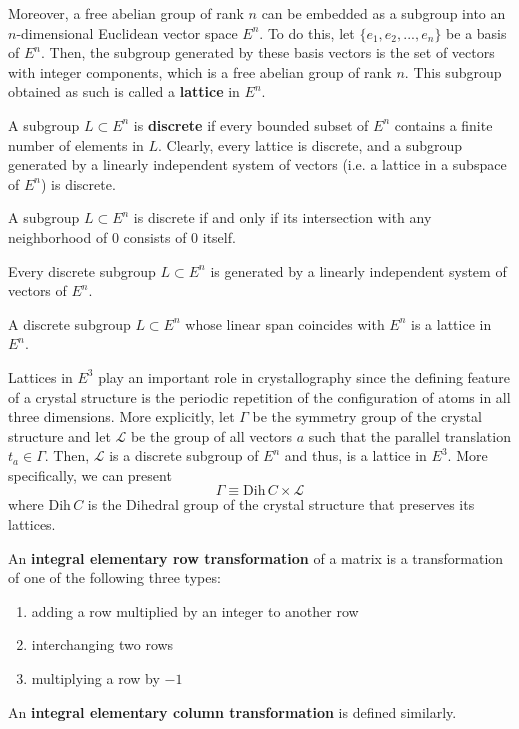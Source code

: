 \documentclass{article}
\begin{document}
  Moreover, a free abelian group of rank $n$ can be embedded as a subgroup into an $n$-dimensional Euclidean vector space $E^n$. To do this, let $\{e_1, e_2, ..., e_n\}$ be a basis of $E^n$. Then, the subgroup generated by these basis vectors is the set of vectors with integer components, which is a free abelian group of rank $n$. This subgroup obtained as such is called a \textbf{lattice} in $E^n$. 

  \begin{definition}
    A subgroup $L \subset E^n$ is \textbf{discrete} if every bounded subset of $E^n$ contains a finite number of elements in $L$. Clearly, every lattice is discrete, and a subgroup generated by a linearly independent system of vectors (i.e. a lattice in a subspace of $E^n$) is discrete. 
  \end{definition}

  \begin{lemma}
    A subgroup $L \subset E^n$ is discrete if and only if its intersection with any neighborhood of $0$ consists of $0$ itself. 
  \end{lemma}

  \begin{theorem}
    Every discrete subgroup $L \subset E^n$ is generated by a linearly independent system of vectors of $E^n$. 
  \end{theorem}

  \begin{corollary}
    A discrete subgroup $L \subset E^n$ whose linear span coincides with $E^n$ is a lattice in $E^n$. 
  \end{corollary}

  Lattices in $E^3$ play an important role in crystallography since the defining feature of a crystal structure is the periodic repetition of the configuration of atoms in all three dimensions. More explicitly, let $\Gamma$ be the symmetry group of the crystal structure and let $\mathcal{L}$ be the group of all vectors $a$ such that the parallel translation $t_a \in \Gamma$. Then, $\mathcal{L}$ is a discrete subgroup of $E^n$ and thus, is a lattice in $E^3$. More specifically, we can present 
  \begin{equation}
    \Gamma \equiv \text{Dih}\,C \times \mathcal{L}
  \end{equation}
  where Dih$\, C$ is the Dihedral group of the crystal structure that preserves its lattices. 

  \begin{definition}
    An \textbf{integral elementary row transformation} of a matrix is a transformation of one of the following three types: 
    \begin{enumerate}
      \item adding a row multiplied by an integer to another row
      \item interchanging two rows
      \item multiplying a row by $-1$ 
    \end{enumerate}
    An \textbf{integral elementary column transformation} is defined similarly. 
  \end{definition}
\end{document}
